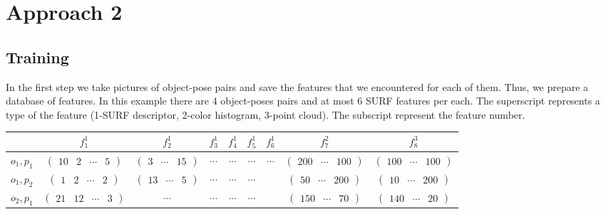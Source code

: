 \documentclass[11pt]{article}
\begin{document}
\section{Approach 2}
\subsection{Training}

	In the first step we take pictures of object-pose pairs and save the features that we encountered for each of them. Thus, we prepare a database of features. In this example there are 4 object-poses pairs and at most 6 SURF features per each. The superscript represents a type of the feature (1-SURF descriptor, 2-color histogram, 3-point cloud). The subscript represent the feature number.
	
	\begin{table}[h]
			\centering
			\begin{tabular}{c|c c c c c c c c} %
				& $f_1^1$ & $f_2^1$ & $f_3^1$ & $f_4^1$ & $f_5^1$ & $f_6^1$ & $f_7^2$ & $f_8^3$ \\
				\hline 	    %
				$o_1,p_1$ 	& $\begin{pmatrix} 10 & 2 & \cdots & 5\end{pmatrix} $	& $\begin{pmatrix} 3 & \cdots & 15\end{pmatrix} $ 	& $\cdots$	& $\cdots$	& $\cdots$ 	& $\cdots$ & $\begin{pmatrix} 200 & \cdots & 100\end{pmatrix} $ 	& $\begin{pmatrix} 100 & \cdots & 100\end{pmatrix} $	\\
				$o_1,p_2$ 	& $\begin{pmatrix} 1 & 2 & \cdots & 2\end{pmatrix} $	& $\begin{pmatrix} 13 & \cdots & 5\end{pmatrix} $ 	& $\cdots$	& $\cdots$	& $\cdots$ 	&  & $\begin{pmatrix} 50 & \cdots & 200\end{pmatrix} $ 	& $\begin{pmatrix} 10 & \cdots & 200\end{pmatrix} $		\\
				$o_2,p_1$ 	& $\begin{pmatrix} 21 & 12 & \cdots & 3\end{pmatrix} $	& $\cdots$ 	& $\cdots$	& $\cdots$	& $\cdots$ 	&  & $\begin{pmatrix} 150 & \cdots & 70\end{pmatrix} $ 	& $\begin{pmatrix} 140 & \cdots & 20\end{pmatrix} $	\\

\end{tabular}
\end{table}
\end{document}
